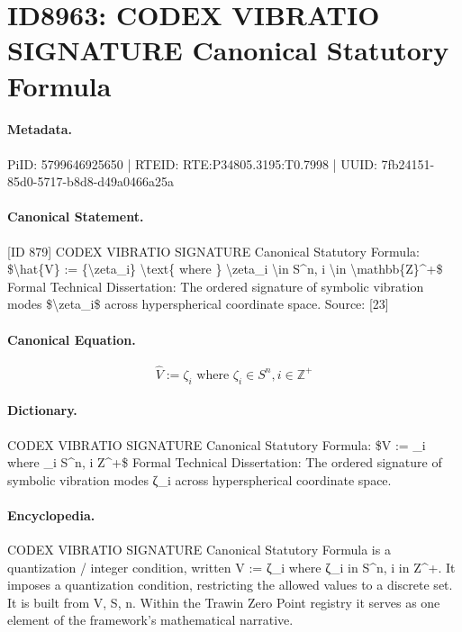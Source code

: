 \section*{ID8963: CODEX VIBRATIO SIGNATURE Canonical Statutory Formula}
\paragraph{Metadata.}
PiID: 5799646925650 | RTEID: RTE:P34805.3195:T0.7998 | UUID: 7fb24151-85d0-5717-b8d8-d49a0466a25a

\paragraph{Canonical Statement.}
[ID 879] CODEX VIBRATIO SIGNATURE Canonical Statutory Formula: \$\textbackslash{}hat\{V\} := \{\textbackslash{}zeta\_i\} \textbackslash{}text\{ where \} \textbackslash{}zeta\_i \textbackslash{}in S\textasciicircum{}n, i \textbackslash{}in \textbackslash{}mathbb\{Z\}\textasciicircum{}+\$ Formal Technical Dissertation: The ordered signature of symbolic vibration modes \$\textbackslash{}zeta\_i\$ across hyperspherical coordinate space. Source: [23]

\paragraph{Canonical Equation.}
\[
\hat{V} := {\zeta_i} \text{ where } \zeta_i \in S^n, i \in \mathbb{Z}^+
\]

\paragraph{Dictionary.}
CODEX VIBRATIO SIGNATURE Canonical Statutory Formula: \$V := \_i where \_i S\textasciicircum{}n, i Z\textasciicircum{}+\$ Formal Technical Dissertation: The ordered signature of symbolic vibration modes ζ\_i across hyperspherical coordinate space.

\paragraph{Encyclopedia.}
CODEX VIBRATIO SIGNATURE Canonical Statutory Formula is a quantization / integer condition, written V := ζ\_i where ζ\_i in S\textasciicircum{}n, i in Z\textasciicircum{}+. It imposes a quantization condition, restricting the allowed values to a discrete set. It is built from V, S, n. Within the Trawin Zero Point registry it serves as one element of the framework's mathematical narrative.
